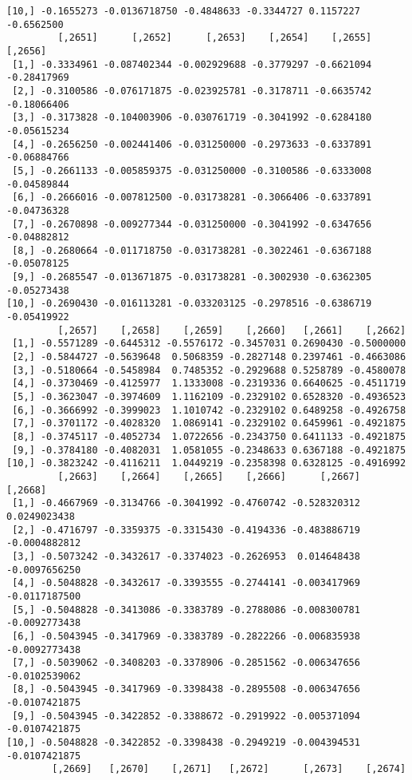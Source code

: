 \documentclass[
  letterpaper,
  DIV=11,
  numbers=noendperiod]{scrreprt}
\begin{document}
\begin{verbatim}
[10,] -0.1655273 -0.0136718750 -0.4848633 -0.3344727 0.1157227 -0.6562500
         [,2651]      [,2652]      [,2653]    [,2654]    [,2655]     [,2656]
 [1,] -0.3334961 -0.087402344 -0.002929688 -0.3779297 -0.6621094 -0.28417969
 [2,] -0.3100586 -0.076171875 -0.023925781 -0.3178711 -0.6635742 -0.18066406
 [3,] -0.3173828 -0.104003906 -0.030761719 -0.3041992 -0.6284180 -0.05615234
 [4,] -0.2656250 -0.002441406 -0.031250000 -0.2973633 -0.6337891 -0.06884766
 [5,] -0.2661133 -0.005859375 -0.031250000 -0.3100586 -0.6333008 -0.04589844
 [6,] -0.2666016 -0.007812500 -0.031738281 -0.3066406 -0.6337891 -0.04736328
 [7,] -0.2670898 -0.009277344 -0.031250000 -0.3041992 -0.6347656 -0.04882812
 [8,] -0.2680664 -0.011718750 -0.031738281 -0.3022461 -0.6367188 -0.05078125
 [9,] -0.2685547 -0.013671875 -0.031738281 -0.3002930 -0.6362305 -0.05273438
[10,] -0.2690430 -0.016113281 -0.033203125 -0.2978516 -0.6386719 -0.05419922
         [,2657]    [,2658]    [,2659]    [,2660]   [,2661]    [,2662]
 [1,] -0.5571289 -0.6445312 -0.5576172 -0.3457031 0.2690430 -0.5000000
 [2,] -0.5844727 -0.5639648  0.5068359 -0.2827148 0.2397461 -0.4663086
 [3,] -0.5180664 -0.5458984  0.7485352 -0.2929688 0.5258789 -0.4580078
 [4,] -0.3730469 -0.4125977  1.1333008 -0.2319336 0.6640625 -0.4511719
 [5,] -0.3623047 -0.3974609  1.1162109 -0.2329102 0.6528320 -0.4936523
 [6,] -0.3666992 -0.3999023  1.1010742 -0.2329102 0.6489258 -0.4926758
 [7,] -0.3701172 -0.4028320  1.0869141 -0.2329102 0.6459961 -0.4921875
 [8,] -0.3745117 -0.4052734  1.0722656 -0.2343750 0.6411133 -0.4921875
 [9,] -0.3784180 -0.4082031  1.0581055 -0.2348633 0.6367188 -0.4921875
[10,] -0.3823242 -0.4116211  1.0449219 -0.2358398 0.6328125 -0.4916992
         [,2663]    [,2664]    [,2665]    [,2666]      [,2667]       [,2668]
 [1,] -0.4667969 -0.3134766 -0.3041992 -0.4760742 -0.528320312  0.0249023438
 [2,] -0.4716797 -0.3359375 -0.3315430 -0.4194336 -0.483886719 -0.0004882812
 [3,] -0.5073242 -0.3432617 -0.3374023 -0.2626953  0.014648438 -0.0097656250
 [4,] -0.5048828 -0.3432617 -0.3393555 -0.2744141 -0.003417969 -0.0117187500
 [5,] -0.5048828 -0.3413086 -0.3383789 -0.2788086 -0.008300781 -0.0092773438
 [6,] -0.5043945 -0.3417969 -0.3383789 -0.2822266 -0.006835938 -0.0092773438
 [7,] -0.5039062 -0.3408203 -0.3378906 -0.2851562 -0.006347656 -0.0102539062
 [8,] -0.5043945 -0.3417969 -0.3398438 -0.2895508 -0.006347656 -0.0107421875
 [9,] -0.5043945 -0.3422852 -0.3388672 -0.2919922 -0.005371094 -0.0107421875
[10,] -0.5048828 -0.3422852 -0.3398438 -0.2949219 -0.004394531 -0.0107421875
        [,2669]   [,2670]    [,2671]   [,2672]      [,2673]    [,2674]

\end{verbatim}
\end{document}
